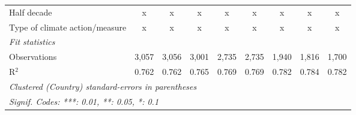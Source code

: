 \begin{tabular}{lcccccccc}
   Half decade                                                            & x            & x            & x            & x            & x            & x            & x             & x\\  
   Type of climate action/measure                                         & x            & x            & x            & x            & x            & x            & x             & x\\  
   \midrule \emph{Fit statistics}\\
   Observations                                                           & 3,057        & 3,056        & 3,001        & 2,735        & 2,735        & 1,940        & 1,816         & 1,700\\  
   R$^2$                                                                  & 0.762        & 0.762        & 0.765        & 0.769        & 0.769        & 0.782        & 0.784         & 0.782\\  
   \midrule
   \multicolumn{9}{l}{\emph{Clustered (Country) standard-errors in parentheses}}\\
   \multicolumn{9}{l}{\emph{Signif. Codes: ***: 0.01, **: 0.05, *: 0.1}}\\
\end{tabular}
\par\endgroup



